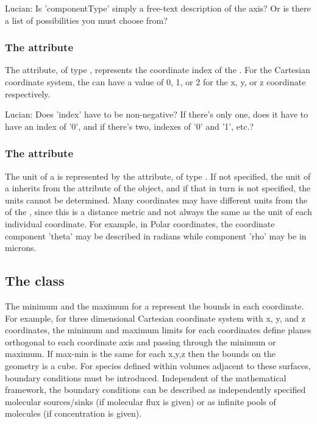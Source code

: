 {\color{red} Lucian: \notice Is 'componentType' simply a free-text description of the axis?  Or is there a list of possibilities you must choose from?}


\subsubsection{The  attribute}
The  attribute, of type , represents the coordinate index of the \CoordinateComponent. For the Cartesian coordinate system, the  can have a value of 0, 1, or 2 for the x, y, or z coordinate respectively.

{\color{red} Lucian: \notice Does 'index' have to be non-negative?  If there's only one, does it have to have an index of '0', and if there's two, indexes of '0' and '1', etc.?}

\subsubsection{The  attribute}
The unit of a \CoordinateComponent is represented by the  attribute, of type .  If not specified, the unit of a \CoordinateComponent inherits from the  attribute of the \Model object, and if that in turn is not specified, the \CoordinateComponent units cannot be determined.  Many coordinates may have different units from the  of the \Model, since this is a distance metric and not always the same as the unit of each individual coordinate.  For example, in Polar coordinates, the coordinate component 'theta' may be described in radians while component 'rho' may be in microns.  


\subsection{The  class}
\label{Boundary-class}
The minimum and the maximum for a \CoordinateComponent represent the bounds in each coordinate.  For example, for three dimensional Cartesian coordinate system with x, y, and z coordinates, the minimum and maximum limits for each coordinates define planes orthogonal to each coordinate axis and passing through the minimum or maximum.  If max-min is the same for each x,y,z then the bounds on the geometry is a cube.  For species defined within volumes adjacent to these surfaces, boundary conditions must be introduced.  Independent of the mathematical framework, the boundary conditions can be described as independently specified molecular sources/sinks (if molecular flux is given) or as infinite pools of molecules (if concentration is given).

